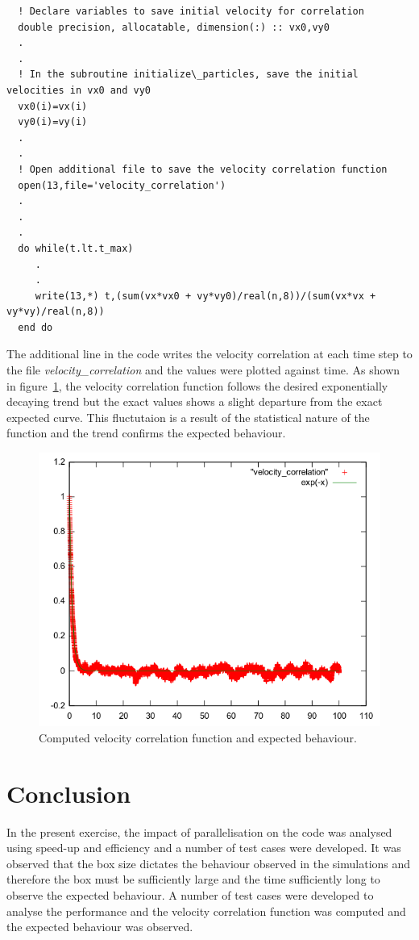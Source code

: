 \documentclass[11pt, oneside]{article}
\begin{document}
\begin{lstlisting}
  ! Declare variables to save initial velocity for correlation
  double precision, allocatable, dimension(:) :: vx0,vy0
  .
  .
  ! In the subroutine initialize\_particles, save the initial velocities in vx0 and vy0
  vx0(i)=vx(i)
  vy0(i)=vy(i)
  .
  .
  ! Open additional file to save the velocity correlation function
  open(13,file='velocity_correlation')
  .
  .
  .
  do while(t.lt.t_max)
     .
     .
     write(13,*) t,(sum(vx*vx0 + vy*vy0)/real(n,8))/(sum(vx*vx + vy*vy)/real(n,8))
  end do
\end{lstlisting}     

The additional line in the code writes the velocity correlation at each time step to the file \textit{velocity\_correlation} and the values were plotted against time. As shown in figure~\ref{fig:vcf}, the velocity correlation function follows the desired exponentially decaying trend but the exact values shows a slight departure from the exact expected curve. This fluctutaion is a result of the statistical nature of the function and the trend confirms the expected behaviour. 
	\begin{figure}[h]
		\centering
		\includegraphics[width=\textwidth]{vcf.png}
		\caption{Computed velocity correlation function and expected behaviour.}
		\label{fig:vcf}
	\end{figure} 


        

\section{Conclusion}
In the present exercise, the impact of parallelisation on the code was analysed using speed-up and efficiency and a number of test cases were developed. It was observed that the box size dictates the behaviour observed in the simulations and therefore the box must be sufficiently large and the time sufficiently long to observe the expected behaviour. A number of test cases were developed to analyse the performance and the velocity correlation function was computed and the expected behaviour was observed.                    



\end{document}
